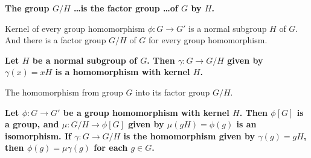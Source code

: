 \documentclass[a4paper,12pt,openany]{book}
\begin{document}
\textbf{\phantom{}}
\textbf{The group $G/H$ \dots is the factor group \dots of $G$ by $H$.}\\
\begin{challenge}
	Kernel of every group homomorphism $\phi : G \to G'$ is a normal subgroup $H$ of $G$.
	And there is a factor group $G/H$ of $G$ for every group homomorphism.
\end{challenge}

\textbf{\phantom{}}
\textbf{Let $H$ be a normal subgroup of $G$. Then $\gamma : G \to G/H$ given by $\gamma(x) = xH$ is a homomorphism with kernel $H$.}\\
\begin{story}
	The homomorphism from group $G$ into its factor group $G/H$.
\end{story}

\textbf{\phantom{}}
\textbf{Let $\phi : G \to G'$ be a group homomorphism with kernel $H$. Then $\phi[G]$ is a group, and $\mu : G/H \to \phi[G]$ given by $\mu(gH) = \phi(g)$ is an isomorphism. If $\gamma : G \to G/H$ is the homomorphism given by $\gamma(g) = gH$, then $\phi(g) = \mu\gamma(g)$ for each $g \in G$.}


%


\end{document}
